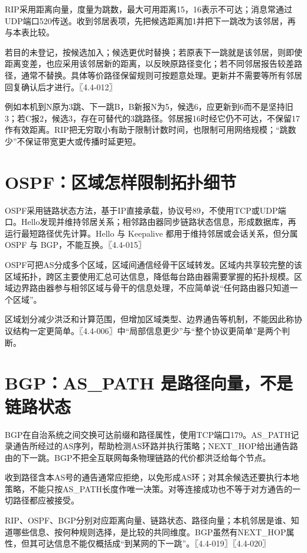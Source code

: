 RIP采用距离向量，度量为跳数，最大可用距离15，16表示不可达；消息常通过UDP端口520传送。收到邻居表项，先把候选距离加1并把下一跳改为该邻居，再与本表比较。

若目的未登记，按候选加入；候选更优时替换；若原表下一跳就是该邻居，则即使距离变差，也应采用该邻居新的距离，以反映原路径变化；若不同邻居报告较差路径，通常不替换。具体等价路径保留规则可按题意处理。更新并不需要等所有邻居回复确认后才进行。〖4.4-012〗

例如本机到N原为3跳、下一跳B，B新报N为5，候选6，应更新到6而不是坚持旧3；若C报2，候选3，存在可替代的3跳路径。邻居报16时经它仍不可达，不保留17作有效距离。RIP把无穷取小有助于限制计数时间，也限制可用网络规模；``跳数少''不保证带宽更大或传播时延更短。

\section{OSPF：区域怎样限制拓扑细节}\label{CN04-17}

OSPF采用链路状态方法，基于IP直接承载，协议号89，不使用TCP或UDP端口。Hello发现并维持邻居关系；相邻路由器同步链路状态信息，形成数据库，再运行最短路径优先计算。Hello 与 Keepalive 都用于维持邻居或会话关系，但分属 OSPF 与 BGP，不能互换。〖4.4-015〗

OSPF可把AS分成多个区域，区域间通信经骨干区域转发。区域内共享较完整的该区域拓扑，跨区主要使用汇总可达信息，降低每台路由器需要掌握的拓扑规模。区域边界路由器参与相邻区域与骨干的信息处理，不应简单说``任何路由器只知道一个区域''。

区域划分减少洪泛和计算范围，但增加区域类型、边界通告等机制，不能因此称协议结构一定更简单。〖4.4-006〗中``局部信息更少''与``整个协议更简单''是两个判断。

\section{BGP：AS\_PATH 是路径向量，不是链路状态}\label{CN04-18}

BGP在自治系统之间交换可达前缀和路径属性，使用TCP端口179。AS\_PATH记录通告所经过的AS序列，帮助检测AS环路并执行策略；NEXT\_HOP给出通告路由的下一跳。BGP不把全互联网每条物理链路的代价都洪泛给每个节点。

收到路径含本AS号的通告通常应拒绝，以免形成AS环；对其余候选还要执行本地策略，不能只按AS\_PATH长度作唯一决策。对等连接成功也不等于对方通告的一切路径都应被接受。

RIP、OSPF、BGP分别对应距离向量、链路状态、路径向量；本机邻居是谁、知道哪些信息、按何种规则选择，是比较的共同维度。BGP虽然有NEXT\_HOP属性，但其可达信息不能仅概括成``到某网的下一跳''。〖4.4-019〗〖4.4-020〗

